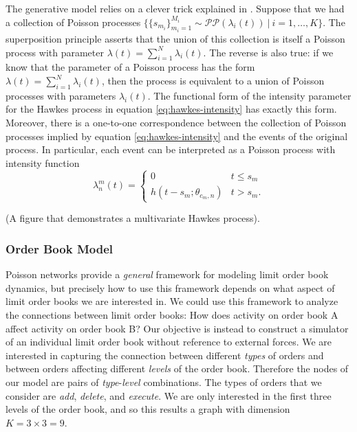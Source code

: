 The generative model relies on a clever trick explained in \cite{}. Suppose that we had a collection of Poisson processes $\{\{s_{m_i}\}_{m_i = 1}^{M_i} \sim \mathcal{PP}(\lambda_i(t)) \ | \ i = 1, \dots, K\}$. The superposition principle asserts that the union of this collection is itself a Poisson process with parameter $\lambda(t) = \sum_{i=1}^{N} \lambda_i(t)$. The reverse is also true: if we know that the parameter of a Poisson process has the form $\lambda(t) = \sum_{i=1}^{N} \lambda_i(t)$, then the process is equivalent to a union of Poisson processes with parameters $\lambda_i(t)$. The functional form of the intensity parameter for the Hawkes process in equation \eqref{eq:hawkes-intensity} has exactly this form. Moreover, there is a one-to-one correspondence between the collection of Poisson processes implied by equation \eqref{eq:hawkes-intensity} and the events of the original process. In particular, each event can be interpreted as a Poisson process with intensity function
\begin{equation}
	\lambda_n^m(t) = \begin{cases}
				          0 & t \le s_m \\
				          h(t - s_m; \theta_{c_m, n}) & t > s_m.
				      \end{cases}
\end{equation}

(A figure that demonstrates a multivariate Hawkes process).


\subsubsection{Order Book Model}
Poisson networks provide a \textit{general} framework for modeling limit order book dynamics, but precisely how to use this framework depends on what aspect of limit order books we are interested in. We could use this framework to analyze the connections between limit order books: How does activity on order book A affect activity on order book B? Our objective is instead to construct a simulator of an individual limit order book without reference to external forces. We are interested in capturing the connection between different \textit{types} of orders and between orders affecting different \textit{levels} of the order book. Therefore the nodes of our model are pairs of \textit{type}-\textit{level} combinations. The types of orders that we consider are \textit{add}, \textit{delete}, and \textit{execute}. We are only interested in the first three levels of the order book, and so this results a graph with dimension $K = 3 \times 3 = 9$.

